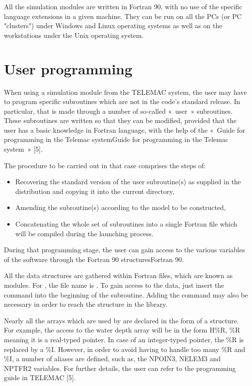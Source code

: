 All the simulation modules are written in Fortran 90, with no use of the
specific language extensions in a given machine. They can be run on all the PCs
(or PC "clusters") under Windows and Linux operating systems as well as on the
workstations under the Unix operating system.

\section{User programming}

When using a simulation module from the TELEMAC system, the user may have to
program specific subroutines which are not in the code's standard release. In
particular, that is made through a number of so-called «~user~» subroutines.
These subroutines are written so that they can be modified, provided that the
user has a basic knowledge in Fortran language, with the help of the «~Guide
for programming in the Telemac systemGuide for programming in the Telemac
system~» [5].

The procedure to be carried out in that case comprises the steps of:

\begin{itemize}
\item Recovering the standard version of the user subroutine(s) as supplied in
the distribution and copying it into the current directory,
\item Amending the subroutine(s) according to the model to be constructed,
\item Concatenating the whole set of subroutines into a single Fortran file
which will be compiled during the  launching process.
\end{itemize}

During that programming stage, the user can gain access to the various
variables of the software through the Fortran 90 structuresFortran 90.

All the data structures are gathered within Fortran files, which are known as
modules. For , the file name is . To gain
access to the  data, just insert the command  into the beginning of the subroutine. Adding the
command  may also be necessary in order to reach the structure in the
\bief library.

Nearly all the arrays which are used by  are declared in the form of
a structure. For example, the access to the water depth array will be in the
form H\%R, \%R meaning it is a real-typed pointer. In case of an integer-typed
pointer, the \%R is replaced by a \%I. However, in order to avoid having to
handle too many \%R and \%I, a number of aliases are defined, such as, the
NPOIN3, NELEM3 and NPTFR2 variables. For further details, the user can refer to
the programming guide in TELEMAC [5].
